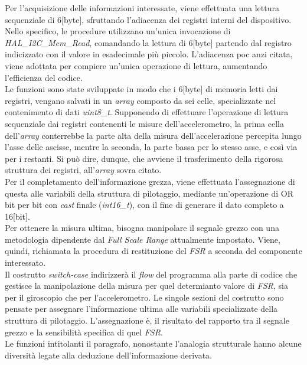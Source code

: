 \documentclass[11pt]{report}
\begin{document}
Per l'acquisizione delle informazioni interessate, viene effettuata una lettura sequenziale di 6[byte], sfruttando l'adiacenza dei registri interni del dispositivo.
Nello specifico, le procedure utilizzano un'unica invocazione di \textit{HAL\_I2C\_Mem\_Read}, comandando la lettura di 6[byte] partendo dal registro indicizzato con il valore in esadecimale più piccolo. L'adiacenza poc anzi citata, viene adottata per compiere un'unica operazione di lettura, aumentando l'efficienza del codice.\\
Le funzioni sono state sviluppate in modo che i 6[byte] di memoria letti dai registri, vengano salvati in un \textit{array} composto da sei celle, specializzate nel contenimento di dati \textit{uint8\_t}.
Supponendo di effettuare l'operazione di lettura sequenziale dai registri contenenti le misure dell'accelerometro, la prima cella dell'\textit{array} conterrebbe la parte alta della misura dell'accelerazione percepita lungo l'asse delle ascisse, mentre la seconda, la parte bassa per lo stesso asse, e così via per i restanti.
Si può dire, dunque, che avviene il trasferimento della rigorosa struttura dei registri, all'\textit{array} sovra citato.\\
Per il completamento dell'informazione grezza, viene effettuata l'assegnazione di questa alle variabili della struttura di pilotaggio, mediante un'operazione di OR bit per bit con \textit{cast} finale (\textit{int16\_t}), con il fine di generare il dato completo a 16[bit].\\
Per ottenere la misura ultima, bisogna manipolare il segnale grezzo con una metodologia dipendente dal \textit{Full Scale Range} attualmente impostato. Viene, quindi, richiamata la procedura di restituzione del \textit{FSR} a seconda del componente interessato.\\
Il costrutto \textit{switch-case} indirizzerà il \textit{flow} del programma alla parte di codice che gestisce la manipolazione della misura per quel determianto valore di \textit{FSR}, sia per il giroscopio che per l'accelerometro. Le singole sezioni del costrutto sono pensate per assegnare l'informazione ultima alle variabili specializzate della struttura di pilotaggio.
L'assegnazione è, il risultato del rapporto tra il segnale grezzo e la sensibilità specifica di quel \textit{FSR}.\\
Le funzioni intitolanti il paragrafo, nonostante l'analogia strutturale hanno alcune diversità legate alla deduzione dell'informazione derivata.
\end{document}
